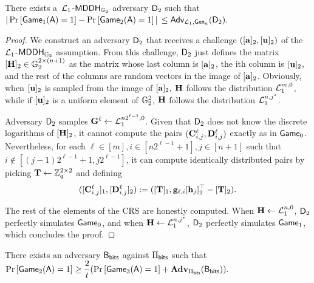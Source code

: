 \begin{lemma} There exists a\ \(\mathcal{L}_1\)-\(\mathsf{MDDH}_{\mathbb{G}_2}\) adversary \(\mathsf{D}_2\) such that
\(|\Pr\left[\allowbreak\mathsf{Game}_{1}(\advA)\allowbreak=1\right]\linebreak-\Pr\left[\mathsf{Game}_{2}(\advA)=1\right]|\) \(\leq \mathsf{Adv}_{\mathcal{L}_1,\mathsf{Gen}_a}(\mathsf{D}_2).\)
\end{lemma}
\begin{proof}
We construct an adversary \(\mathsf{D}_2\) that receives 
a challenge \(([\mathbf{a}]_2,[\mathbf{u}]_2)\) of the 
\(\mathcal{L}_1\)-\(\mathsf{MDDH}_{\mathbb{G}_2}\) assumption. From this challenge, \(\mathsf{D}_2\) just defines the matrix  \([\mathbf{{H}}]_2\in\mathbb{G}_2^{2\times(n+1)}\) as the matrix whose last column is \([\mathbf{a}]_2\), the ith column is \([\mathbf{u}]_2\), and the rest of the columns are random vectors in the image of \([\mathbf{a}]_2\). 
Obviously, when \([\mathbf{u}]_2\) is sampled from 
the image of \([\mathbf{a}]_2,\) \(\mathbf{{H}}\) follows the distribution \(\mathcal{L}_1^{m,0}\), while if \([\mathbf{u}]_2\) is a uniform element of \(\mathbb{G}^2_2\), \(\mathbf{{H}}\) follows the distribution \(\mathcal{L}_1^{n,j^*}\). 
 
Adversary \(\mathsf{D}_2\) samples
\(\mathbf{{G}}^\ell \gets \mathcal{L}_1^{n2^{\ell-1},0}\). Given that \(\mathsf{D}_2\) does not know the discrete logarithms of \([\mathbf{{H}}]_2\), it cannot compute the pairs \((\mathbf{{C}}^\ell_{i,j},\mathbf{{D}}^\ell_{i,j})\) exactly as in \(\mathsf{Game}_0\). Nevertheless, for each \(\ell\in[m],i\in[n2^{\ell-1}+1],j\in[n+1]\) such that $i\notin[(j-1)2^{\ell-1}+1,j2^{\ell-1}]$, it can compute identically distributed pairs by picking \(\mathbf{{T}}\gets\mathbb{Z}_q^{2\times 2}\) and defining
\[
([\mathbf{{C}}^\ell_{i,j}]_1,[\mathbf{{D}}^\ell_{i,j}]_2):=([\mathbf{{T}}]_1,\mathbf{g}_{\ell,i}[\mathbf{h}_j]_2^\top-[\mathbf{{T}}]_2).
\]

The rest of the elements of the CRS are honestly computed. When \(\mathbf{{H}}\gets\mathcal{L}_1^{n,0}\), \(\mathsf{D}_2\) perfectly simulates \(\mathsf{Game}_0\), and when \(\mathbf{{H}}\gets\mathcal{L}_1^{n,j^*}\), \(\mathsf{D}_2\) perfectly simulates \(\mathsf{Game}_1\), which concludes the proof. 
\end{proof}

\begin{lemma} There exists an adversary \(\mathsf{B}_{\mathsf{bits}}\) against \(\Pi_{\mathsf{bits}}\) such that
\(\Pr\left[\allowbreak \mathsf{Game}_2(\mathsf{A})\allowbreak =1\right]\geq\dfrac{2}{t }(\Pr\left[\mathsf{Game}_3(\mathsf{A})=1\right]+\mathbf{Adv}_{\Pi_{\mathsf{bits}}}(\mathsf{B}_{\mathsf{bits}})).\)
\end{lemma}

